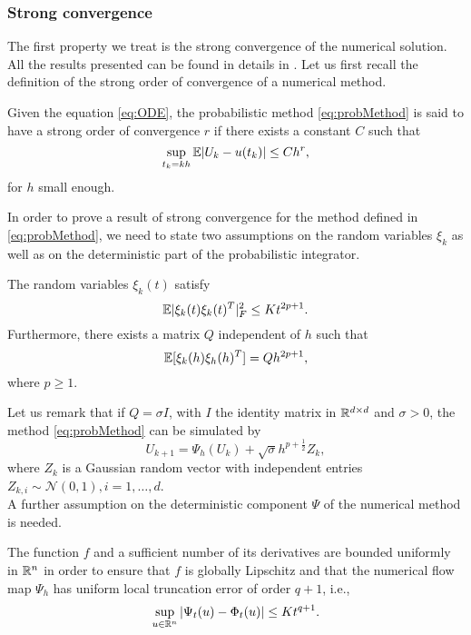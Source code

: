 \subsubsection{Strong convergence}

The first property we treat is the strong convergence of the numerical solution. All the results presented can be found in details in \cite{CGS16}. Let us first recall the definition of the strong order of convergence of a numerical method. 
\begin{definition} Given the equation \eqref{eq:ODE}, the probabilistic method \eqref{eq:probMethod} is said to have a strong order of convergence $r$ if there exists a constant $C$ such that
\begin{equation}
	\sup_{t_k = kh} \mathbb{E}\abs{U_k - u(t_k)} \leq Ch^r,
\end{equation}
for $h$ small enough.
\end{definition}
\noindent In order to prove a result of strong convergence for the method defined in \eqref{eq:probMethod}, we need to state two assumptions on the random variables $\xi_k$ as well as on the deterministic part of the probabilistic integrator. 
\begin{assumption}\label{assumption_1} The random variables $\xi_k(t)$ satisfy
\begin{equation}
	\mathbb{E}|\xi_k(t)\xi_k(t)^T|^2_F \leq Kt^{2p+1}.
\end{equation}
Furthermore, there exists a matrix $Q$ independent of $h$ such that 
\begin{equation}
	\mathbb{E}[\xi_k(h)\xi_h(h)^T] = Qh^{2p+1},
\end{equation}
where $p\geq 1$.
\end{assumption}
\noindent Let us remark that if $Q = \sigma I$, with $I$ the identity matrix in $\mathbb{R}^{d\times d}$ and $\sigma > 0$, the method \eqref{eq:probMethod} can be simulated by
\begin{equation}
	U_{k+1} = \Psi_h(U_k) + \sqrt{\sigma} h^{p + \frac{1}{2}} Z_k,
\end{equation}
where $Z_k$ is a Gaussian random vector with independent entries $Z_{k,i}  \sim\mathcal{N}(0,1), i = 1, \ldots, d$. \\
A further assumption on the deterministic component $\Psi$ of the numerical method is needed.
\begin{assumption}\label{assumption_2}  The function $f$ and a sufficient number of its derivatives are bounded uniformly in $\mathbb{R}^n$ in order to ensure that $f$ is globally Lipschitz and that the numerical flow map $\Psi_h$ has uniform local truncation error of order $q + 1$, i.e., 
\begin{equation}
	\sup_{u\in\mathbb{R}^n} |\Psi_t(u) - \Phi_t(u)| \leq Kt^{q+1}.
\end{equation}
\end{assumption}
